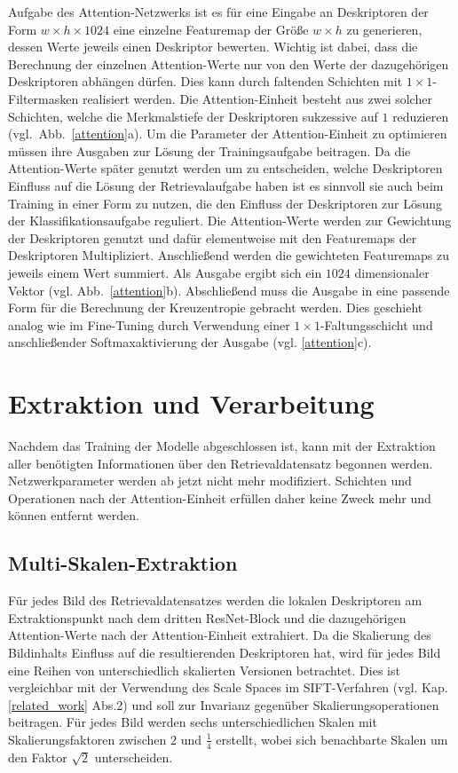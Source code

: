 Aufgabe des Attention-Netzwerks ist es für eine Eingabe an Deskriptoren der Form $w\times h\times 1024$ eine einzelne Featuremap der Größe $w\times h$ zu generieren, dessen Werte jeweils einen Deskriptor bewerten. Wichtig ist dabei, dass die Berechnung der einzelnen Attention-Werte nur von den Werte der dazugehörigen Deskriptoren abhängen dürfen. Dies kann durch faltenden Schichten mit $1\times1$-Filtermasken realisiert werden. Die Attention-Einheit besteht aus zwei solcher Schichten, welche die Merkmalstiefe der Deskriptoren sukzessive auf $1$ reduzieren \mbox{(vgl. Abb.~\ref{attention}a).}  
Um die Parameter der Attention-Einheit zu optimieren müssen ihre Ausgaben zur Lösung der Trainingsaufgabe beitragen. Da die Attention-Werte später genutzt werden um zu entscheiden, welche Deskriptoren Einfluss auf die Lösung der Retrievalaufgabe haben ist es sinnvoll sie auch beim Training in einer Form zu nutzen, die den Einfluss der Deskriptoren zur Lösung der Klassifikationsaufgabe reguliert. Die Attention-Werte werden zur Gewichtung der Deskriptoren genutzt und dafür elementweise mit den Featuremaps der Deskriptoren Multipliziert. Anschließend werden die gewichteten Featuremaps zu jeweils einem Wert summiert. Als Ausgabe ergibt sich ein $1024$ dimensionaler Vektor (vgl. Abb.~\ref{attention}b). Abschließend muss die Ausgabe in eine passende Form für die Berechnung der Kreuzentropie gebracht werden. Dies geschieht analog wie im Fine-Tuning durch Verwendung einer $1\times1$-Faltungsschicht und anschließender Softmaxaktivierung der Ausgabe (vgl. \ref{attention}c).


\section{Extraktion und Verarbeitung}

Nachdem das Training der Modelle abgeschlossen ist, kann mit der Extraktion aller benötigten Informationen über den Retrievaldatensatz begonnen werden. Netzwerkparameter werden ab jetzt nicht mehr modifiziert. Schichten und Operationen nach der Attention-Einheit erfüllen daher keine Zweck mehr und können entfernt werden.
\subsection{Multi-Skalen-Extraktion}
Für jedes Bild des Retrievaldatensatzes werden die lokalen Deskriptoren am Extraktionspunkt nach dem dritten ResNet-Block und die dazugehörigen Attention-Werte nach der Attention-Einheit extrahiert. Da die Skalierung des Bildinhalts Einfluss auf die resultierenden Deskriptoren hat, wird für jedes Bild eine Reihen von unterschiedlich skalierten Versionen betrachtet. Dies ist vergleichbar mit der Verwendung des Scale Spaces im SIFT-Verfahren (vgl. Kap.\ref{related_work} Abs.2) und soll zur Invarianz gegenüber Skalierungsoperationen beitragen. Für jedes Bild werden sechs unterschiedlichen Skalen mit Skalierungsfaktoren zwischen $2$ und $\frac{1}{4}$ erstellt, wobei sich benachbarte Skalen um den Faktor $\sqrt{2}$ unterscheiden. 

